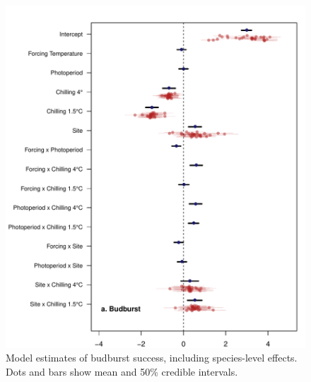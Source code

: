 \documentclass{article}
\begin{document}
\begin{figure}
\label{figS8}
\includegraphics[width=1\textwidth, page=1]{NonBBLO_sp}
\caption{Model estimates of budburst success, including species-level effects. Dots and bars show mean and 50\% credible intervals.}
\end{figure}
\end{document}
